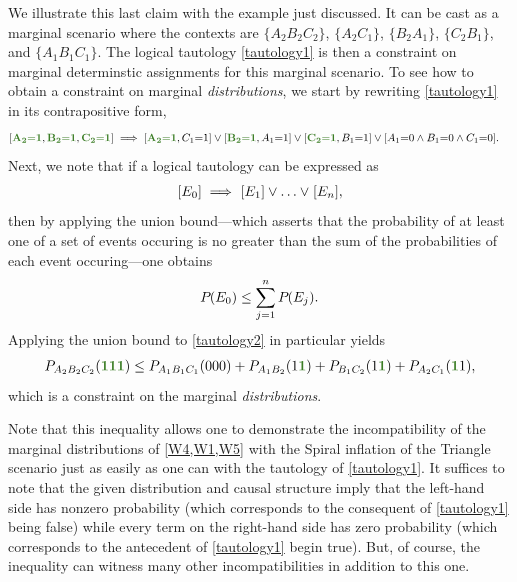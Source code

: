 {We illustrate this last claim with the example just discussed.  It can be cast as a marginal scenario where the contexts are $\{A_2 B_2 C_2\}$, $\{A_2 C_1\}$, $\{B_2 A_1\}$, $\{C_2 B_1\}$, and  $\{A_1 B_1 C_1\}$.  The logical tautology \eqref{tautology1} is then a constraint on marginal determinstic  assignments for this marginal scenario.   To see how to obtain a constraint on marginal {\em distributions}, we start by rewriting \cref{tautology1} in its contrapositive form,
\begin{align}\begin{split}\label{tautology2}
&[\mgreen{A_2 \eql 1} , \mgreen{B_2 \eql 1} , \mgreen{C_2 \eql 1}]  \implies [\mgreen{A_2 \eql 1}, C_1 \eql 1] \lor  [\mgreen{B_2 \eql 1}, A_1 \eql 1] \lor  [\mgreen{C_2 \eql 1}, B_1 \eql 1] \lor  [A_1 \eql 0 \land B_1 \eql 0 \land C_1 \eql 0].
\end{split}\end{align}
Next, we note that if a logical tautology can be expressed as
\begin{align}\label{eq:inference}
    {\operatorname{\mathsf{}}_{}}\lbrack E_0\rbrack \implies {\operatorname{\mathsf{}}_{}}\lbrack E_1\rbrack \lor \ldots \lor {\operatorname{\mathsf{}}_{}}\lbrack E_n\rbrack,
\end{align}
then by applying the union bound---which asserts that the probability of at least one of a set of events occuring is no greater than the sum of the probabilities of each event occuring---one obtains
\begin{align}\label{eq:possinference}
{P_{}}\lparen E_0\rparen\leq \sum\limits_{j=1}^n{{P_{}}\lparen E_j\rparen}.
\end{align}
Applying the union bound to \cref{tautology2} in particular yields
\begin{align}\label{eq:F3rawweak}
P_{A_2 B_2 C_2}\parens{\mgreen{1} \mgreen{1} \mgreen{1}} \leq P_{A_1 B_1 C_1}\parens{0 0 0}+P_{A_1 B_2}\parens{1 \mgreen{1 }}+P_{ B_1 C_2}\parens{ 1 \mgreen{1}}+P_{A_2 C_1}\parens{\mgreen{1 } 1},
\end{align}
which is a constraint on the marginal {\em distributions}.
 
Note that this inequality allows one to demonstrate the incompatibility of the marginal distributions of \cref{W4,W1,W5} with the Spiral inflation of the Triangle scenario just as easily as one can with the tautology of \cref{tautology1}.  It suffices to note that the given distribution and causal structure imply that the left-hand side has nonzero probability (which corresponds to the consequent of \cref{tautology1} being false) while every term on the right-hand side has zero probability (which corresponds to the antecedent of  \cref{tautology1} begin true).
But, of course, the inequality can witness many other incompatibilities in addition to this one.

}
